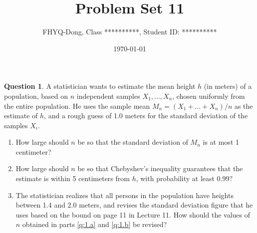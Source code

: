 \documentclass[utf8]{article}
\title{Problem Set 11}
\author{ FHYQ-Dong, Class **********, Student ID: ********** }
\date{\today}
\theoremstyle{definition}%
\newtheorem{question}{Question} %
\theoremstyle{plain}%
\begin{document}
\maketitle
\thispagestyle{fancy}

\begin{question}
    A statistician wants to estimate the mean height $h$ (in meters) of a population, based on $n$ independent samples $X_1, \ldots, X_n$, chosen uniformly from the entire population. He uses the sample mean $M_n = (X_1+ \ldots + X_n) / n$ as the estimate of $h$, and a rough guess of 1.0 meters for the standard deviation of the samples $X_i$.
    \begin{enumerate}[label=(\alph*)]
        \item \label{q:1.a} How large should $n$ be so that the standard deviation of $M_n$ is at most 1 centimeter?
        \item \label{q:1.b} How large should $n$ be so that Chebyshev's inequality guarantees that the estimate is within 5 centimeters from $h$, with probability at least 0.99?
        \item The statistician realizes that all persons in the population have heights between 1.4 and 2.0 meters, and revises the standard deviation figure that he uses based on the bound on page 11 in Lecture 11. How should the values of $n$ obtained in parts \ref{q:1.a} and \ref{q:1.b} be revised?
    \end{enumerate}
\end{question}
\end{document}
